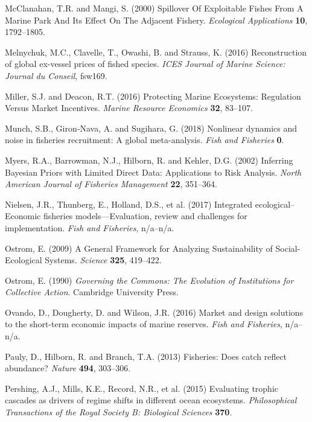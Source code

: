 \documentclass[twoside,12pt,final]{ucthesis-CA2012}
\begin{document}
\begin{ucmainmatter}
\hypertarget{ref-McClanahan2000}{}
McClanahan, T.R. and Mangi, S. (2000) Spillover Of Exploitable Fishes
From A Marine Park And Its Effect On The Adjacent Fishery.
\emph{Ecological Applications} \textbf{10}, 1792--1805.

\hypertarget{ref-Melnychuk2016}{}
Melnychuk, M.C., Clavelle, T., Owashi, B. and Strauss, K. (2016)
Reconstruction of global ex-vessel prices of fished species. \emph{ICES
Journal of Marine Science: Journal du Conseil}, fsw169.

\hypertarget{ref-Miller2016}{}
Miller, S.J. and Deacon, R.T. (2016) Protecting Marine Ecosystems:
Regulation Versus Market Incentives. \emph{Marine Resource Economics}
\textbf{32}, 83--107.

\hypertarget{ref-Munch2018}{}
Munch, S.B., Giron‐Nava, A. and Sugihara, G. (2018) Nonlinear dynamics
and noise in fisheries recruitment: A global meta-analysis. \emph{Fish
and Fisheries} \textbf{0}.

\hypertarget{ref-Myers2002}{}
Myers, R.A., Barrowman, N.J., Hilborn, R. and Kehler, D.G. (2002)
Inferring Bayesian Priors with Limited Direct Data: Applications to Risk
Analysis. \emph{North American Journal of Fisheries Management}
\textbf{22}, 351--364.

\hypertarget{ref-Nielsen2017}{}
Nielsen, J.R., Thunberg, E., Holland, D.S., et al. (2017) Integrated
ecological--Economic fisheries models---Evaluation, review and
challenges for implementation. \emph{Fish and Fisheries}, n/a--n/a.

\hypertarget{ref-Ostrom2009}{}
Ostrom, E. (2009) A General Framework for Analyzing Sustainability of
Social-Ecological Systems. \emph{Science} \textbf{325}, 419--422.

\hypertarget{ref-Ostrom1990}{}
Ostrom, E. (1990) \emph{Governing the Commons: The Evolution of
Institutions for Collective Action}. Cambridge University Press.

\hypertarget{ref-Ovando2016a}{}
Ovando, D., Dougherty, D. and Wilson, J.R. (2016) Market and design
solutions to the short-term economic impacts of marine reserves.
\emph{Fish and Fisheries}, n/a--n/a.

\hypertarget{ref-Pauly2013}{}
Pauly, D., Hilborn, R. and Branch, T.A. (2013) Fisheries: Does catch
reflect abundance? \emph{Nature} \textbf{494}, 303--306.

\hypertarget{ref-Pershing2015a}{}
Pershing, A.J., Mills, K.E., Record, N.R., et al. (2015) Evaluating
trophic cascades as drivers of regime shifts in different ocean
ecosystems. \emph{Philosophical Transactions of the Royal Society B:
Biological Sciences} \textbf{370}.


\end{ucmainmatter}
\end{document}
